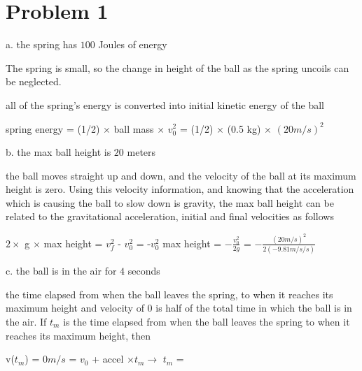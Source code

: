 \chapter{Problem 1}
\label{Problem 1}
a. the spring has $100$ Joules of energy

The spring is small, so the change in height of the ball as the spring uncoils can be neglected.

all of the spring's energy is converted into initial kinetic energy of the ball

spring energy = (1/2) $\times$ ball mass $\times$ $v_{0}^{2}$
			  = (1/2) $\times$ (0.5 kg) $\times$ $(20 m/s)^{2}$


b. the max ball height is $20$ meters

the ball moves straight up and down, and the velocity of the ball at its maximum height is zero.
Using this velocity information, and knowing that the acceleration which is causing the ball
to slow down is gravity, the max ball height can be related to the gravitational acceleration,
initial and final velocities as follows

$2 \times$ g $\times$ max height = $v_{f}^{2}$ - $v_{0}^{2}$ = -$v_{0}^{2}$
max height = $ -\frac{v_{0}^{2}}{2g} $ = $-\frac{(20 m/s)^{2}}{2(-9.81 m/s/s)}$


c. the ball is in the air for $4$ seconds

the time elapsed from when the ball leaves the spring, to when it reaches its maximum height
and velocity of $0$ is half of the total time in which the ball is in the air.
If $t_{m}$ is the time elapsed from when the ball leaves the spring to when it reaches its
maximum height, then

v($t_{m}$) = $0 m/s$ = $v_{0}$ + accel $\times t_{m} \rightarrow$ $t_{m}$ = 

